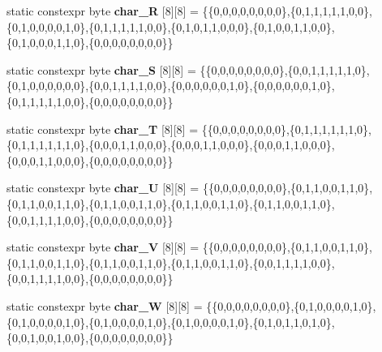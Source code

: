\begin{DoxyCompactItemize}
\item 
static constexpr byte {\bfseries char\+\_\+R} \mbox{[}8\mbox{]}\mbox{[}8\mbox{]} = \{\{0,0,0,0,0,0,0,0\},\{0,1,1,1,1,1,0,0\},\{0,1,0,0,0,0,1,0\},\{0,1,1,1,1,1,0,0\},\{0,1,0,1,1,0,0,0\},\{0,1,0,0,1,1,0,0\},\{0,1,0,0,0,1,1,0\},\{0,0,0,0,0,0,0,0\}\}\hypertarget{classcharacters_a21bc29cd21f32de698075f1cd33057f7}{}\label{classcharacters_a21bc29cd21f32de698075f1cd33057f7}

\item 
static constexpr byte {\bfseries char\+\_\+S} \mbox{[}8\mbox{]}\mbox{[}8\mbox{]} = \{\{0,0,0,0,0,0,0,0\},\{0,0,1,1,1,1,1,0\},\{0,1,0,0,0,0,0,0\},\{0,0,1,1,1,1,0,0\},\{0,0,0,0,0,0,1,0\},\{0,0,0,0,0,0,1,0\},\{0,1,1,1,1,1,0,0\},\{0,0,0,0,0,0,0,0\}\}\hypertarget{classcharacters_ae092217119e4a642e75849a3082a17c1}{}\label{classcharacters_ae092217119e4a642e75849a3082a17c1}

\item 
static constexpr byte {\bfseries char\+\_\+T} \mbox{[}8\mbox{]}\mbox{[}8\mbox{]} = \{\{0,0,0,0,0,0,0,0\},\{0,1,1,1,1,1,1,0\},\{0,1,1,1,1,1,1,0\},\{0,0,0,1,1,0,0,0\},\{0,0,0,1,1,0,0,0\},\{0,0,0,1,1,0,0,0\},\{0,0,0,1,1,0,0,0\},\{0,0,0,0,0,0,0,0\}\}\hypertarget{classcharacters_a02a1646e04a811420a9104e525b116e2}{}\label{classcharacters_a02a1646e04a811420a9104e525b116e2}

\item 
static constexpr byte {\bfseries char\+\_\+U} \mbox{[}8\mbox{]}\mbox{[}8\mbox{]} = \{\{0,0,0,0,0,0,0,0\},\{0,1,1,0,0,1,1,0\},\{0,1,1,0,0,1,1,0\},\{0,1,1,0,0,1,1,0\},\{0,1,1,0,0,1,1,0\},\{0,1,1,0,0,1,1,0\},\{0,0,1,1,1,1,0,0\},\{0,0,0,0,0,0,0,0\}\}\hypertarget{classcharacters_aa500add57d6ac245b4c6130aee27576e}{}\label{classcharacters_aa500add57d6ac245b4c6130aee27576e}

\item 
static constexpr byte {\bfseries char\+\_\+V} \mbox{[}8\mbox{]}\mbox{[}8\mbox{]} = \{\{0,0,0,0,0,0,0,0\},\{0,1,1,0,0,1,1,0\},\{0,1,1,0,0,1,1,0\},\{0,1,1,0,0,1,1,0\},\{0,1,1,0,0,1,1,0\},\{0,0,1,1,1,1,0,0\},\{0,0,1,1,1,1,0,0\},\{0,0,0,0,0,0,0,0\}\}\hypertarget{classcharacters_a6d29be421603ec802fffda6241026207}{}\label{classcharacters_a6d29be421603ec802fffda6241026207}

\item 
static constexpr byte {\bfseries char\+\_\+W} \mbox{[}8\mbox{]}\mbox{[}8\mbox{]} = \{\{0,0,0,0,0,0,0,0\},\{0,1,0,0,0,0,1,0\},\{0,1,0,0,0,0,1,0\},\{0,1,0,0,0,0,1,0\},\{0,1,0,0,0,0,1,0\},\{0,1,0,1,1,0,1,0\},\{0,0,1,0,0,1,0,0\},\{0,0,0,0,0,0,0,0\}\}\hypertarget{classcharacters_ad4617322aaae76ca30b273e447ef9b86}{}\label{classcharacters_ad4617322aaae76ca30b273e447ef9b86}


\end{DoxyCompactItemize}
